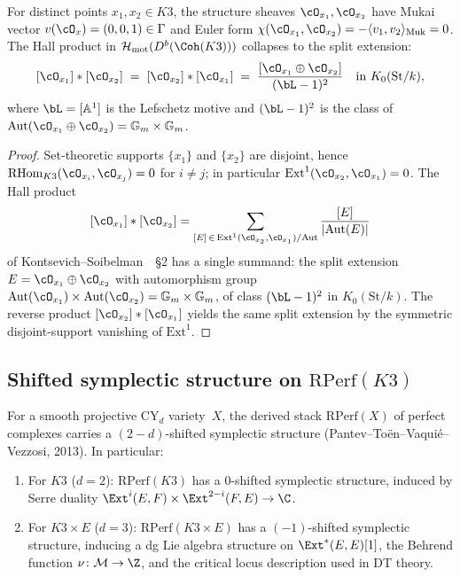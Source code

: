 \begin{lemma}
\label{lem:k3e-hall-rank0-commutative}
For distinct points $x_1, x_2 \in K3$, the structure sheaves $\cO_{x_1}, \cO_{x_2}$ have Mukai vector $v(\cO_x) = (0, 0, 1) \in \Gamma$ and Euler form $\chi(\cO_{x_1}, \cO_{x_2}) = -\langle v_1, v_2 \rangle_{\mathrm{Muk}} = 0$. The Hall product in $\mathcal{H}_{\mathrm{mot}}(D^b(\Coh(K3)))$ collapses to the split extension:
\[
 [\cO_{x_1}] * [\cO_{x_2}] \;=\; [\cO_{x_2}] * [\cO_{x_1}] \;=\; \frac{[\cO_{x_1} \oplus \cO_{x_2}]}{(\bL - 1)^2} \quad \text{in } K_0(\mathrm{St}/k),
\]
where $\bL = [\mathbb{A}^1]$ is the Lefschetz motive and $(\bL - 1)^2$ is the class of $\mathrm{Aut}(\cO_{x_1} \oplus \cO_{x_2}) = \mathbb{G}_m \times \mathbb{G}_m$.
\end{lemma}

\begin{proof}
Set-theoretic supports $\{x_1\}$ and $\{x_2\}$ are disjoint, hence $\mathrm{RHom}_{K3}(\cO_{x_i}, \cO_{x_j}) = 0$ for $i \neq j$; in particular $\mathrm{Ext}^1(\cO_{x_2}, \cO_{x_1}) = 0$. The Hall product
\[
 [\cO_{x_1}] * [\cO_{x_2}] = \sum_{[E] \,\in\, \mathrm{Ext}^1(\cO_{x_2}, \cO_{x_1})/\mathrm{Aut}} \frac{[E]}{|\mathrm{Aut}(E)|}
\]
of Kontsevich--Soibelman~\cite{KS2008}~\S$2$ has a single summand: the split extension $E = \cO_{x_1} \oplus \cO_{x_2}$ with automorphism group $\mathrm{Aut}(\cO_{x_1}) \times \mathrm{Aut}(\cO_{x_2}) = \mathbb{G}_m \times \mathbb{G}_m$, of class $(\bL - 1)^2$ in $K_0(\mathrm{St}/k)$. The reverse product $[\cO_{x_2}] * [\cO_{x_1}]$ yields the same split extension by the symmetric disjoint-support vanishing of $\mathrm{Ext}^1$.
\end{proof}

\subsection{Shifted symplectic structure on \texorpdfstring{$\mathrm{RPerf}(K3)$}{RPerf(K3)}}
\label{subsec:k3e-ptvv}

\begin{proposition}
\label{prop:k3e-ptvv}
For a smooth projective CY$_d$ variety~$X$, the derived stack $\mathrm{RPerf}(X)$ of perfect complexes carries a $(2-d)$-shifted symplectic structure \textup{(Pantev--To\"en--Vaqui\'e--Vezzosi, 2013)}. In particular:
\begin{enumerate}[label=(\roman*)]
 \item For $K3$ ($d=2$): $\mathrm{RPerf}(K3)$ has a $0$-shifted symplectic structure, induced by Serre duality $\Ext^i(E,F) \times \Ext^{2-i}(F,E) \to \C$.
 \item For $K3 \times E$ ($d=3$): $\mathrm{RPerf}(K3 \times E)$ has a $(-1)$-shifted symplectic structure, inducing a dg Lie algebra structure on $\Ext^*(E,E)[1]$, the Behrend function $\nu \colon \mathcal{M} \to \Z$, and the critical locus description used in DT theory.
\end{enumerate}
\end{proposition}

